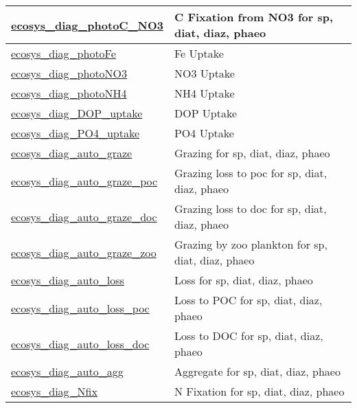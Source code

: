 {\begin{center}
\begin{longtable}{| p{2.0in} | p{4.0in} |}
    \hline
    \hyperref[subsec:var_sec_forcing_ecosys_diag_photoC_NO3]{ecosys\_diag\_photoC\_NO3} & C Fixation from NO3 for sp, diat, diaz, phaeo \\
    \hline
    \hyperref[subsec:var_sec_forcing_ecosys_diag_photoFe]{ecosys\_diag\_photoFe} & Fe Uptake \\
    \hline
    \hyperref[subsec:var_sec_forcing_ecosys_diag_photoNO3]{ecosys\_diag\_photoNO3} & NO3 Uptake \\
    \hline
    \hyperref[subsec:var_sec_forcing_ecosys_diag_photoNH4]{ecosys\_diag\_photoNH4} & NH4 Uptake \\
    \hline
    \hyperref[subsec:var_sec_forcing_ecosys_diag_DOP_uptake]{ecosys\_diag\_DOP\_uptake} & DOP Uptake \\
    \hline
    \hyperref[subsec:var_sec_forcing_ecosys_diag_PO4_uptake]{ecosys\_diag\_PO4\_uptake} & PO4 Uptake \\
    \hline
    \hyperref[subsec:var_sec_forcing_ecosys_diag_auto_graze]{ecosys\_diag\_auto\_graze} & Grazing for sp, diat, diaz, phaeo \\
    \hline
    \hyperref[subsec:var_sec_forcing_ecosys_diag_auto_graze_poc]{ecosys\_diag\_auto\_graze\_poc} & Grazing loss to poc for sp, diat, diaz, phaeo \\
    \hline
    \hyperref[subsec:var_sec_forcing_ecosys_diag_auto_graze_doc]{ecosys\_diag\_auto\_graze\_doc} & Grazing loss to doc for sp, diat, diaz, phaeo \\
    \hline
    \hyperref[subsec:var_sec_forcing_ecosys_diag_auto_graze_zoo]{ecosys\_diag\_auto\_graze\_zoo} & Grazing by zoo plankton for sp, diat, diaz, phaeo \\
    \hline
    \hyperref[subsec:var_sec_forcing_ecosys_diag_auto_loss]{ecosys\_diag\_auto\_loss} & Loss for sp, diat, diaz, phaeo \\
    \hline
    \hyperref[subsec:var_sec_forcing_ecosys_diag_auto_loss_poc]{ecosys\_diag\_auto\_loss\_poc} & Loss to POC for sp, diat, diaz, phaeo \\
    \hline
    \hyperref[subsec:var_sec_forcing_ecosys_diag_auto_loss_doc]{ecosys\_diag\_auto\_loss\_doc} & Loss to DOC for sp, diat, diaz, phaeo \\
    \hline
    \hyperref[subsec:var_sec_forcing_ecosys_diag_auto_agg]{ecosys\_diag\_auto\_agg} & Aggregate for sp, diat, diaz, phaeo \\
    \hline
    \hyperref[subsec:var_sec_forcing_ecosys_diag_Nfix]{ecosys\_diag\_Nfix} & N Fixation for sp, diat, diaz, phaeo \\

\end{longtable}
\end{center}}
